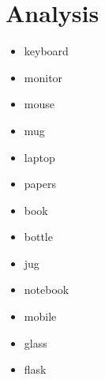 \documentclass[letterpaper, 10 pt, conference]{ieeeconf}  %
\begin{document}

\section{Analysis}
\label{sec:Analysis}

\begin{itemize}	
\item keyboard
\item monitor
\item mouse
\item mug
\item laptop
\item papers
\item book
\item bottle
\item jug
\item notebook
\item mobile
\item glass
\item flask
\end{itemize}

\end{document}
